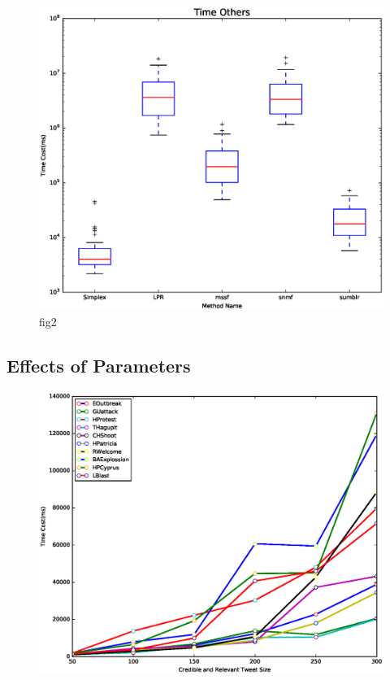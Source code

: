 \documentclass{llncs}
\begin{document}
\begin{figure}
    \centering
    \includegraphics[scale=0.5]{log_time1.eps}
    \caption{fig2}
    \label{fig:side:b}
\end{figure}

\subsection{Effects of Parameters}


\begin{figure}
    \centering
    \includegraphics[scale=0.5]{summary-timecost.eps}

\end{figure}
\end{document}
